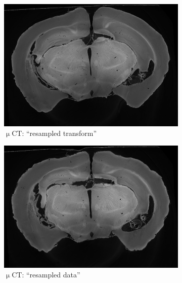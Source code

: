 \documentclass[11pt]{article}
\begin{document}
\begin{figure}[h]
  \begin{subfigure}[b]{0.3\textwidth}
    \centering
    \includegraphics[width=\linewidth]{figs/bilinear_15_sampled_Warped_617}
    \caption{$\upmu$CT: ``resampled transform''}
    \label{fig:retrans}
  \end{subfigure}
  \hspace{1em}
  \begin{subfigure}[b]{0.3\textwidth}
    \centering
    \includegraphics[width=\linewidth]{figs/bilinear_15Warped_617}
    \caption{$\upmu$CT: ``resampled data''}
    \label{fig:redata}
  \end{subfigure}
  \hspace{1em}
    \begin{subfigure}[b]{0.3\textwidth}
    \centering

\end{subfigure}
\end{figure}
\end{document}
